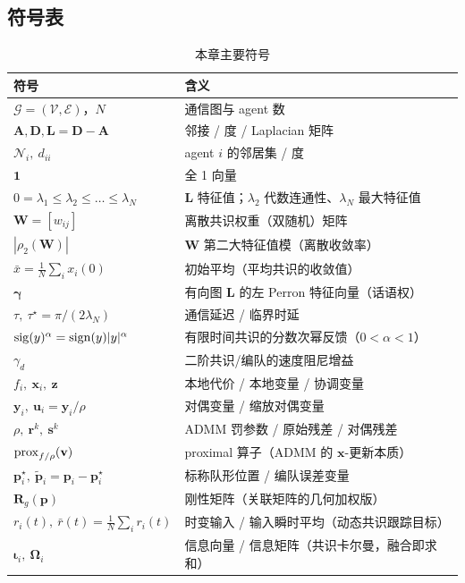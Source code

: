 \subsection*{符号表}
\begin{table}[H]\centering\small
\caption{本章主要符号}
\label{tab:cs-symbols}
\begin{tabular}{ll}
\toprule
符号 & 含义 \\
\midrule
$\mathcal{G}=(\mathcal{V},\mathcal{E})$，$N$ & 通信图与 agent 数 \\
$\mathbf{A},\mathbf{D},\mathbf{L}=\mathbf{D}-\mathbf{A}$ & 邻接 / 度 / Laplacian 矩阵 \\
$\mathcal{N}_i,\ d_{ii}$ & agent $i$ 的邻居集 / 度 \\
$\mathbf{1}$ & 全 1 向量 \\
$0=\lambda_1\le\lambda_2\le\dots\le\lambda_N$ & $\mathbf{L}$ 特征值；$\lambda_2$ 代数连通性、$\lambda_N$ 最大特征值 \\
$\mathbf{W}=[w_{ij}]$ & 离散共识权重（双随机）矩阵 \\
$|\rho_2(\mathbf{W})|$ & $\mathbf{W}$ 第二大特征值模（离散收敛率） \\
$\bar x=\tfrac1N\sum_i x_i(0)$ & 初始平均（平均共识的收敛值） \\
$\boldsymbol{\gamma}$ & 有向图 $\mathbf{L}$ 的左 Perron 特征向量（话语权） \\
$\tau,\ \tau^\star=\pi/(2\lambda_N)$ & 通信延迟 / 临界时延 \\
$\operatorname{sig}(y)^\alpha=\operatorname{sign}(y)|y|^\alpha$ & 有限时间共识的分数次幂反馈（$0<\alpha<1$） \\
$\gamma_d$ & 二阶共识/编队的速度阻尼增益 \\
$f_i,\ \mathbf{x}_i,\ \mathbf{z}$ & 本地代价 / 本地变量 / 协调变量 \\
$\mathbf{y}_i,\ \mathbf{u}_i=\mathbf{y}_i/\rho$ & 对偶变量 / 缩放对偶变量 \\
$\rho,\ \mathbf{r}^k,\ \mathbf{s}^k$ & ADMM 罚参数 / 原始残差 / 对偶残差 \\
$\operatorname{prox}_{f/\rho}(\mathbf{v})$ & proximal 算子（ADMM 的 $\mathbf{x}$-更新本质） \\
$\mathbf{p}_i^\star,\ \tilde{\mathbf{p}}_i=\mathbf{p}_i-\mathbf{p}_i^\star$ & 标称队形位置 / 编队误差变量 \\
$\mathbf{R}_g(\mathbf{p})$ & 刚性矩阵（关联矩阵的几何加权版） \\
$r_i(t),\ \bar r(t)=\tfrac1N\sum_i r_i(t)$ & 时变输入 / 输入瞬时平均（动态共识跟踪目标） \\
$\boldsymbol{\iota}_i,\ \boldsymbol{\Omega}_i$ & 信息向量 / 信息矩阵（共识卡尔曼，融合即求和） \\
\bottomrule
\end{tabular}
\end{table}

